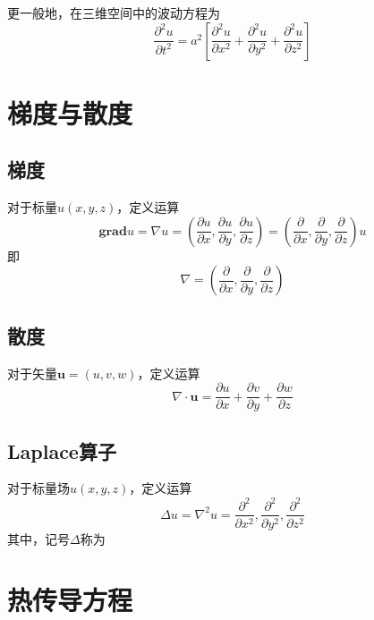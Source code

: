 \theorem[三维空间中的波动方程]
更一般地，在三维空间中的波动方程为
\begin{equation}
	\frac{\partial^2 u}{\partial t^2} = a^2\left[\frac{\partial^2 u}{\partial x^2}  + \frac{\partial^2 u}{\partial y^2}  +\frac{\partial^2 u}{\partial z^2} \right]
\end{equation}


\section{梯度与散度}
\subsection{梯度}
\tdefination[梯度]
对于标量$u(x,y,z)$，定义运算
\begin{equation}
	\textbf{grad} u= \nabla u = \left(\frac{\partial u}{\partial x},\frac{\partial u}{\partial y}, \frac{\partial u}{\partial z}\right)= \left(\frac{\partial }{\partial x},\frac{\partial }{\partial y}, \frac{\partial }{\partial z}\right)u
\end{equation}
即
\begin{equation}
	\nabla = \left(\frac{\partial }{\partial x},\frac{\partial }{\partial y}, \frac{\partial }{\partial z}\right)
\end{equation}

\subsection{散度}
\tdefination[散度]
对于矢量$\bm{u} = (u,v,w)$，定义运算
\begin{equation}
	\nabla\cdot \bm{u} = \frac{\partial u}{\partial x} + \frac{\partial v}{\partial y} + \frac{\partial w}{\partial z}
\end{equation}

\subsection{Laplace算子}
对于标量场$u(x,y,z)$，定义运算
\begin{equation}
	\Delta u= \nabla^2 u= \frac{\partial^2 }{\partial x^2},\frac{\partial^2 }{\partial y^2}, \frac{\partial^2 }{\partial z^2}
\end{equation}
其中，记号$\Delta$称为


\section{热传导方程}
